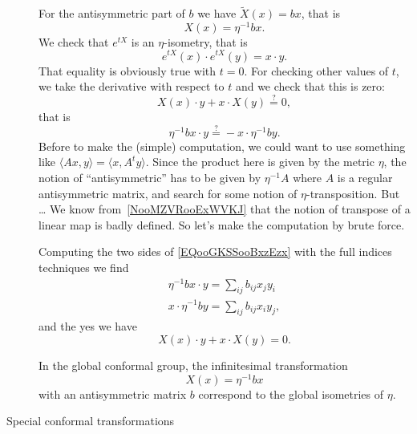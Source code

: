\begin{description}
		For the antisymmetric part of \(b\)  we have \( \tilde X(x)=bx\), that is
		\begin{equation}
			X(x)=\eta^{-1}bx.
		\end{equation}
		We check that \(  e^{tX}\) is an \( \eta\)-isometry, that is
		\begin{equation}
			e^{tX}(x)\cdot  e^{tX}(y)=x\cdot y.
		\end{equation}
		That equality is obviously true with \( t=0\). For checking other values of \( t\), we take the derivative with respect to \( t\) and we check that this is zero:
		\begin{equation}
			X(x)\cdot y+x\cdot X(y)\stackrel{?}{=}0,
		\end{equation}
		that is
		\begin{equation}    \label{EQooGKSSooBxzEzx}
			\eta^{-1}bx\cdot y\stackrel{?}{=}-x\cdot \eta^{-1}by.
		\end{equation}
		Before to make the (simple) computation, we could want to use something like \( \langle Ax, y\rangle =\langle x, A^ty\rangle \). Since the product here is given by the metric \( \eta\), the notion of ``antisymmetric'' has to be given by \( \eta^{-1}A\) where \( A\) is a regular antisymmetric matrix, and search for some notion of \( \eta\)-transposition. But \ldots{} We know from~\ref{NooMZVRooExWVKJ} that the notion of transpose of a linear map is badly defined. So let's make the computation by brute force.

		Computing the two sides of \eqref{EQooGKSSooBxzEzx} with the full indices techniques we find
		\begin{subequations}
			\begin{align}
				\eta^{-1}bx\cdot y=\sum_{ij}b_{ij}x_jy_i \\
				x\cdot \eta^{-1}by=\sum_{ij}b_{ij}x_iy_j,
			\end{align}
		\end{subequations}
		and the yes we have
		\begin{equation}
			X(x)\cdot y+x\cdot X(y)=0.
		\end{equation}

		In the global conformal group, the infinitesimal transformation
		\begin{equation}
			X(x)=\eta^{-1}bx
		\end{equation}
		with an antisymmetric matrix \( b\) correspond to the global isometries of \( \eta\).

	\item[Special conformal transformations]


\end{description}
